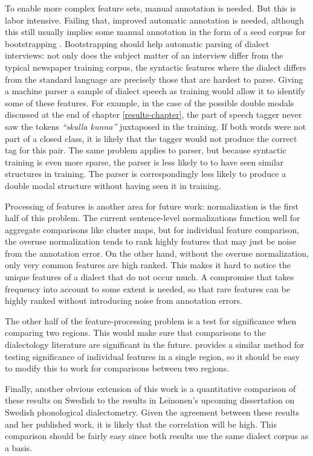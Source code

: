 To enable more complex feature sets, manual annotation is needed. But
this is labor intensive. Failing that, improved automatic annotation
is needed, although this still usually implies some manual annotation
in the form of a seed corpus for bootstrapping
\cite{blitzer07,mcdonald06}. Bootstrapping should help automatic
parsing of dialect interviews: not only does the subject matter of an
interview differ from the typical newspaper training corpus, the
syntactic features where the dialect differs from the standard
language are precisely those that are hardest to parse. Giving a
machine parser a sample of dialect speech as training would allow it
to identify some of these features. For example, in the case of the
possible double modals discussed at the end of chapter
\ref{results-chapter}, the part of speech tagger never saw the tokens
\textit{``skulla kunna''} juxtaposed in the training. If both words
were not part of a closed class, it is likely that the tagger would
not produce the correct tag for this pair. The same problem applies to
parser, but because syntactic training is even more sparse, the parser
is less likely to to have seen similar structures in
training. The parser is correspondingly less likely to produce a
double modal structure without having seen it in training.

Processing of features is another area for future work: normalization
is the first half of this problem. The current sentence-level
normalizations function well for aggregate comparisons like cluster
maps, but for individual feature comparison, the overuse normalization
tends to rank highly features that may just be noise from the
annotation error. On the other hand, without the overuse
normalization, only very common features are high ranked. This makes
it hard to notice the unique features of a dialect that do not occur
much. A compromise that takes frequency into account to some extent is
needed, so that rare features can be highly ranked without introducing
noise from annotation errors.

The other half of the feature-processing problem is a test for
significance when comparing two regions. This would make sure that
comparisons to the dialectology literature are significant in the
future.  provides a similar method for testing
significance of individual features in a single region, so it should
be easy to modify this to work for comparisons between two regions.

Finally, another obvious extension of this work is a quantitative
comparison of these results on Swedish to the results in Leinonen's
upcoming dissertation on Swedish phonological dialectometry. Given the
agreement between these results and her published work, it is likely
that the correlation will be high. This comparison should be fairly
easy since both results use the same dialect corpus as a basis.

